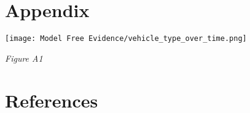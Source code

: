 \documentclass[12pt]{article}
\newenvironment{Figure}
{\par\medskip\noindent\minipage{\linewidth}}
{\endminipage\par\medskip}
\begin{document}
	\section*{Appendix}
	
	\begin{Figure}
		\centering
		\texttt{[image: Model Free Evidence/vehicle\_type\_over\_time.png]}
		
	\end{Figure}
	\begin{center}
		\emph{Figure A1}\\
	\end{center}
	
	
	
	
	
	\pagebreak
	\section*{References}
	
	
	
	
	
	
	
\end{document}
